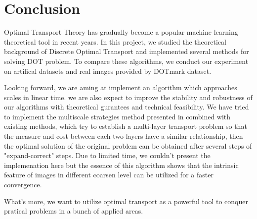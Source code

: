 
\section{Conclusion}
Optimal Transport Theory has gradually become a popular machine learning theoretical tool in recent years. 
In this project, we studied the theoretical background of Discrete Optimal Transport and implemented several methods for solving DOT problem.
To compare these algorithms, we conduct our experiment on artifical datasets and real images provided by DOTmark dataset.

Looking forward, we are aming at implement an algorithm which approaches scales in linear time. we are also expect to improve the stability and robustness 
of our algorithms with theoretical gurantees and technical feasibility. We have tried to implement the multiscale strategies method presented in \cite{article2} combined with existing methods, which try to
 establish a multi-layer transport problem so that the measure and cost between each two layers have
  a similar relationship, then the optimal solution of the original problem can be obtained after several 
  steps of "expand-correct" steps. Due to limited time, we couldn't present the implemenation here but the essence of this
  algorithm shows that the intrinsic feature of images in different coarsen level can be utilized for a faster convergence.

What's more, we want to utilize optimal transport as a powerful tool to conquer pratical problems in a bunch of applied areas.